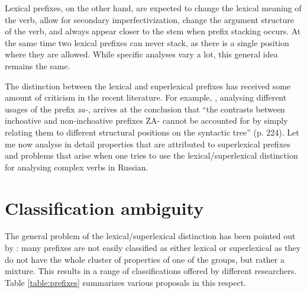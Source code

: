 Lexical prefixes, on the other hand, are expected to change the lexical meaning of the verb, allow for secondary imperfectivization, change the argument structure of the verb, and always appear closer to the stem when prefix stacking occurs. At the same time two lexical prefixes can never stack, as there is a single position where they are allowed. While specific analyses vary a lot, this general idea remains the same. 

The distinction between the lexical and superlexical prefixes has received some amount of criticism in the recent literature. For example, \citet{Braginsky:08}, analysing different usages of the prefix \textit{za-}, arrives at the conclusion that ``the contrasts
between inchoative and non-inchoative prefixes ZA- cannot be accounted for by
simply relating them to different structural positions on the syntactic tree'' (p. 224). Let me now analyse in detail properties that are attributed to superlexical prefixes and problems that arise when one tries to use the lexical/superlexical distinction for analysing complex verbs in Russian.


\section{Classification ambiguity}\label{section:classification}
The general problem of the lexical/superlexical distinction has been pointed out by \citet[32]{Kagan:book}: many prefixes are not easily classified as either lexical or superlexical as they do not have the whole cluster of properties of one of the groups, but rather a mixture. This results in a range of classifications offered by different researchers. Table \ref{table:prefixes} summarizes various proposals in this respect.


